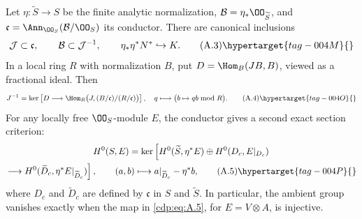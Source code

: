 \begin{proposition}\hypertarget{tag-01AG}{}\label{cdp:st:A.2.2}
\label{wbII:lem:conductor}\label{wbII:lem:conductor-square}
Let $\eta:\widetilde S\to S$ be the finite analytic normalization, $\mathcal B=\eta_*\OO_{\widetilde S}$, and $\mathfrak c=\Ann_{\OO_S}(\mathcal B/\OO_S)$ its conductor. There are canonical inclusions
\[
 \mathcal J\subset\mathfrak c,\qquad
 \mathcal B\subset\mathcal J^{-1},\qquad
 \eta_*\eta^*N^*\hookrightarrow K.
\tag{A.3}\hypertarget{tag-004M}{}\label{cdp:eq:A.3}
\]
In a local ring $R$ with normalization $B$, put $D=\Hom_B(JB,B)$, viewed as a fractional ideal. Then
\[
 J^{-1}=\ker\left[D\longrightarrow
 \Hom_R\bigl(J,(B/\mathfrak c)/(R/\mathfrak c)\bigr)\right],
\quad q\longmapsto\bigl(b\mapsto qb\bmod R\bigr).
\tag{A.4}\hypertarget{tag-004O}{}\label{cdp:eq:A.4}
\]
For any locally free $\OO_S$-module $E$, the conductor gives a second exact section criterion:
\begin{multline}
H^0(S,E)=
\ker\left[H^0(\widetilde S,\eta^*E)\oplus H^0(D_c,E|_{D_c})\right.\\
\left.\longrightarrow H^0(\widetilde D_c,\eta^*E|_{\widetilde D_c})\right],
\qquad (a,b)\longmapsto a|_{\widetilde D_c}-\eta^*b,
\tag{A.5}\hypertarget{tag-004P}{}\label{cdp:eq:A.5}
\end{multline}
where $D_c$ and $\widetilde D_c$ are defined by $\mathfrak c$ in $S$ and $\widetilde S$. In particular, the ambient group vanishes exactly when the map in \eqref{cdp:eq:A.5}, for $E=V\otimes A$, is injective.
\end{proposition}


